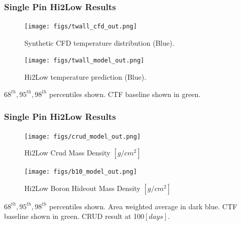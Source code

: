 \documentclass[t, pdftex]{beamer}
\begin{document}
\begin{frame}\frametitle{Single Pin Hi2Low Results}
    \begin{figure}
        \centering
        \begin{minipage}{.5\textwidth}
            \centering
            \texttt{[image: figs/twall\_cfd\_out.png]}
            \caption{Synthetic CFD temperature distribution (Blue).}
        \end{minipage}%
        \begin{minipage}{.5\textwidth}
            \centering
            \texttt{[image: figs/twall\_model\_out.png]}
            \caption{Hi2Low temperature prediction (Blue).}
        \end{minipage}
    \end{figure}
$68^{th}, 95^{th}, 98^{th}$ percentiles shown.
CTF baseline shown in green.
\end{frame}

\begin{frame}\frametitle{Single Pin Hi2Low Results}
    \begin{figure}
        \centering
        \begin{minipage}{.5\textwidth}
            \centering
            \texttt{[image: figs/crud\_model\_out.png]}
            \caption{Hi2Low Crud Mass Density $[g/cm^2]$}
        \end{minipage}%
        \begin{minipage}{.5\textwidth}
            \centering
            \texttt{[image: figs/b10\_model\_out.png]}
            \caption{Hi2Low Boron Hideout Mass Density $[g/cm^2]$}
        \end{minipage}
    \end{figure}
$68^{th}, 95^{th}, 98^{th}$ percentiles shown.
Area weighted average in dark blue.  CTF baseline shown in green.  CRUD result at 100$[days]$.
\end{frame}
\end{document}
